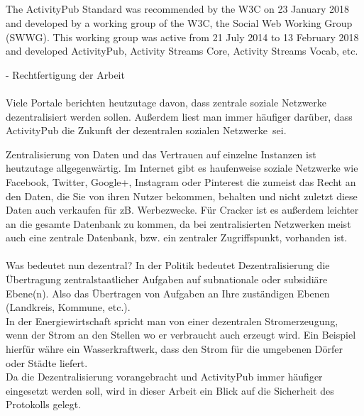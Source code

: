 {	\\\\
	
	\\\\
	The ActivityPub Standard was recommended by the W3C on 23 January 2018 and developed by a working group of the W3C, the Social Web Working Group (SWWG). This working group was active from 21 July 2014 to 13 February 2018 and developed ActivityPub, Activity Streams Core, Activity Streams Vocab, etc.
}{
	- 	Rechtfertigung der Arbeit\\\\
	Viele Portale berichten heutzutage davon, dass zentrale soziale Netzwerke dezentralisiert werden sollen. Außerdem liest man immer häufiger darüber, dass ActivityPub die \glqq Zukunft der dezentralen sozialen Netzwerke\grqq~sei. 
	
	Zentralisierung von Daten und das Vertrauen auf einzelne Instanzen ist heutzutage allgegenwärtig. Im Internet gibt es haufenweise soziale Netzwerke wie Facebook, Twitter, Google+, Instagram oder Pinterest die zumeist das Recht an den Daten, die Sie von ihren Nutzer bekommen, behalten und nicht zuletzt diese Daten auch verkaufen für zB. Werbezwecke. Für Cracker ist es außerdem leichter an die gesamte Datenbank zu kommen, da bei zentralisierten Netzwerken meist auch eine zentrale Datenbank, bzw. ein zentraler Zugriffspunkt, vorhanden ist.\\\\
	
	Was bedeutet nun dezentral? In der Politik bedeutet Dezentralisierung \glqq die Übertragung zentralstaatlicher Aufgaben auf subnationale oder subsidiäre Ebene(n)\grqq\cite{wikipedia-decentralization-politics}. Also das Übertragen von Aufgaben an Ihre zuständigen Ebenen (Landkreis, Kommune, etc.).\\
	In der Energiewirtschaft spricht man von einer \glqq dezentralen Stromerzeugung\grqq, wenn der Strom an den Stellen wo er verbraucht auch erzeugt wird. Ein Beispiel hierfür währe ein Wasserkraftwerk, dass den Strom für die umgebenen Dörfer oder Städte liefert\cite{wikipedia-decentralization-power}.\\
	
	
	Da die Dezentralisierung vorangebracht und ActivityPub immer häufiger eingesetzt werden soll, wird in dieser Arbeit ein Blick auf die Sicherheit des Protokolls gelegt.\\
	
}
